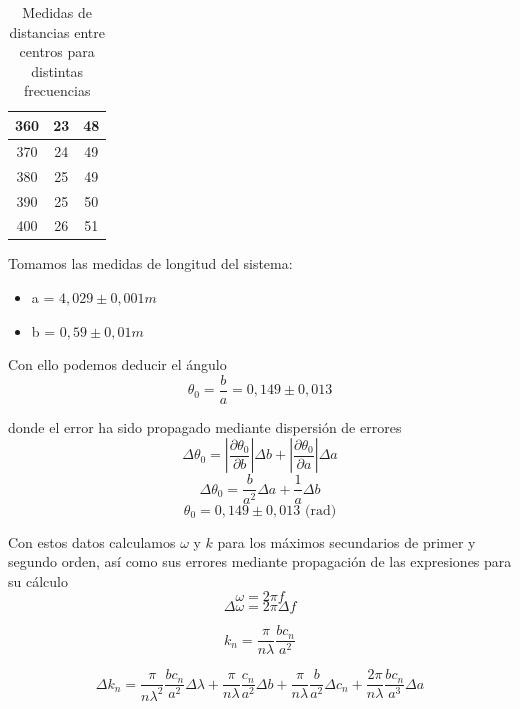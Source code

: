 \documentclass[a4paper,12pt,spanish]{article}
\begin{document}
\begin{table}[H]
\begin{tabular}{|c|c|c|}
			360                     & 23              & 48              \\ \hline
			370                     & 24              & 49              \\ \hline
			380                     & 25              & 49              \\ \hline
			390                     & 25              & 50              \\ \hline
			400                     & 26              & 51              \\ \hline
		\end{tabular}
	\caption{Medidas de distancias entre centros para distintas frecuencias}
	\end{table}
	
	
	
	
	
	Tomamos las medidas de longitud del sistema:
	
	\begin{itemize}
		\item a = $4,029 \pm 0,001 \si{m}$ 
		\item b = $0,59 \pm 0,01 \si{m}$
	\end{itemize}

	
	Con ello podemos deducir el ángulo
	\[\theta_0 = \frac{b}{a} =  0,149 \pm 0,013 
	\]
	
	donde el error ha sido propagado mediante dispersión de errores
	\[ \Delta \theta_0 = \left| \frac{\partial \theta_0}{\partial b} \right| \Delta b + \left| \frac{\partial \theta_0}{\partial a} \right| \Delta a 
	\]
	\[ \Delta \theta_0 = \frac{b}{a^2} \Delta a + \frac{1}{a} \Delta b
	\]
	\[ \theta_0 = 0,149 \pm 0,013 \text{ (rad)}
	\]

	
	Con estos datos calculamos $\omega$ y $k$ para los máximos secundarios de primer y segundo orden, así como sus errores mediante propagación de las expresiones para su cálculo
	\[\omega= 2\pi f
	\]
	\[ \Delta \omega = 2\pi \Delta f
	\]
	
	\[ k_n =\frac{\pi}{n \lambda} \frac{b c_n}{a^2}
	\]
	
	\[ \Delta k_n =  
	\frac{\pi}{n \lambda^2} \frac{b c_n}{a^2} \Delta \lambda +
	\frac{\pi}{n \lambda} \frac{ c_n}{a^2} \Delta b + 
	\frac{\pi}{n \lambda} \frac{b}{a^2} \Delta c_n +
	\frac{2\pi}{n \lambda} \frac{ b c_n}{a^3} \Delta a
	\]
	
\end{document}
